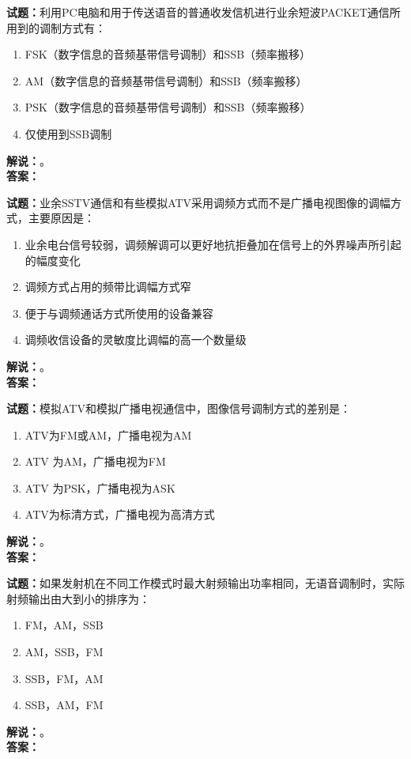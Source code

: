\documentclass{ctexbook}
\begin{document}
\bigskip




\noindent\textbf{试题：}利用PC电脑和用于传送语音的普通收发信机进行业余短波PACKET通信所用到的调制方式有：
\begin{enumerate}[leftmargin=3em]
\item FSK（数字信息的音频基带信号调制）和SSB（频率搬移）
\item AM（数字信息的音频基带信号调制）和SSB（频率搬移）
\item PSK（数字信息的音频基带信号调制）和SSB（频率搬移）
\item 仅使用到SSB调制
\end{enumerate}
\noindent\textbf{解说：}\textbf{}。\\\noindent\textbf{答案：}

\bigskip




\noindent\textbf{试题：}业余SSTV通信和有些模拟ATV采用调频方式而不是广播电视图像的调幅方式，主要原因是：
\begin{enumerate}[leftmargin=3em]
\item 业余电台信号较弱，调频解调可以更好地抗拒叠加在信号上的外界噪声所引起的幅度变化
\item 调频方式占用的频带比调幅方式窄
\item 便于与调频通话方式所使用的设备兼容
\item 调频收信设备的灵敏度比调幅的高一个数量级
\end{enumerate}
\noindent\textbf{解说：}\textbf{}。\\\noindent\textbf{答案：}

\bigskip




\noindent\textbf{试题：}模拟ATV和模拟广播电视通信中，图像信号调制方式的差别是：
\begin{enumerate}[leftmargin=3em]
\item ATV为FM或AM，广播电视为AM
\item ATV 为AM，广播电视为FM
\item ATV 为PSK，广播电视为ASK
\item ATV为标清方式，广播电视为高清方式
\end{enumerate}
\noindent\textbf{解说：}\textbf{}。\\\noindent\textbf{答案：}

\bigskip




\noindent\textbf{试题：}如果发射机在不同工作模式时最大射频输出功率相同，无语音调制时，实际射频输出由大到小的排序为：
\begin{enumerate}[leftmargin=3em]
\item FM，AM，SSB
\item AM，SSB，FM
\item SSB，FM，AM
\item SSB，AM，FM
\end{enumerate}
\noindent\textbf{解说：}\textbf{}。\\\noindent\textbf{答案：}
\end{document}
